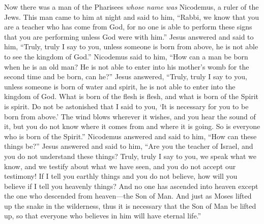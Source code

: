 \begin{biblechapter} %
 Now there was a man of the Pharisees \textit{whose name was} Nicodemus, a ruler of the Jews.
\verse This man came to him at night and said to him, “Rabbi, we know that you are a teacher who has come from God, for no one is able to perform these signs that you are performing unless God were with him.”
\verse Jesus answered and said to him, “Truly, truly I say to you, unless someone is born from above, he is not able to see the kingdom of God.”
\verse Nicodemus said to him, “How can a man be born when he is an old man? He is not able to enter into his mother’s womb for the second time and be born, can he?”
\verse Jesus answered, “Truly, truly I say to you, unless someone is born of water and spirit, he is not able to enter into the kingdom of God.
\verse What is born of the flesh is flesh, and what is born of the Spirit is spirit.
\verse Do not be astonished that I said to you, ‘It is necessary for you to be born from above.’
\verse The wind blows wherever it wishes, and you hear the sound of it, but you do not know where it comes from and where it is going. So is everyone who is born of the Spirit.”
\verse Nicodemus answered and said to him, “How can these things be?”
\verse Jesus answered and said to him, “Are you the teacher of Israel, and you do not understand these things?
\verse Truly, truly I say to you, we speak what we know, and we testify about what we have seen, and you do not accept our testimony!
\verse If I tell you earthly things and you do not believe, how will you believe if I tell you heavenly things?
\verse And no one has ascended into heaven except the one who descended from heaven—the Son of Man.
\verse And just as Moses lifted up the snake in the wilderness, thus it is necessary that the Son of Man be lifted up,
\verse so that everyone who believes in him will have eternal life.”

\end{biblechapter}
